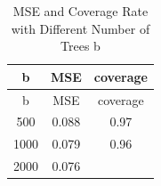 \documentclass[]{article}
\begin{document}
\begin{longtable}[]{@{}ccc@{}}
\caption{MSE and Coverage Rate with Different Number of Trees
b}\tabularnewline
\toprule
\begin{minipage}[b]{0.09\columnwidth}\centering\strut
b\strut
\end{minipage} & \begin{minipage}[b]{0.10\columnwidth}\centering\strut
MSE\strut
\end{minipage} & \begin{minipage}[b]{0.13\columnwidth}\centering\strut
coverage\strut
\end{minipage}\tabularnewline
\midrule
\endfirsthead
\toprule
\begin{minipage}[b]{0.09\columnwidth}\centering\strut
b\strut
\end{minipage} & \begin{minipage}[b]{0.10\columnwidth}\centering\strut
MSE\strut
\end{minipage} & \begin{minipage}[b]{0.13\columnwidth}\centering\strut
coverage\strut
\end{minipage}\tabularnewline
\midrule
\endhead
\begin{minipage}[t]{0.09\columnwidth}\centering\strut
500\strut
\end{minipage} & \begin{minipage}[t]{0.10\columnwidth}\centering\strut
0.088\strut
\end{minipage} & \begin{minipage}[t]{0.13\columnwidth}\centering\strut
0.97\strut
\end{minipage}\tabularnewline
\begin{minipage}[t]{0.09\columnwidth}\centering\strut
1000\strut
\end{minipage} & \begin{minipage}[t]{0.10\columnwidth}\centering\strut
0.079\strut
\end{minipage} & \begin{minipage}[t]{0.13\columnwidth}\centering\strut
0.96\strut
\end{minipage}\tabularnewline
\begin{minipage}[t]{0.09\columnwidth}\centering\strut
2000\strut
\end{minipage} & \begin{minipage}[t]{0.10\columnwidth}\centering\strut
0.076\strut
\end{minipage} & \begin{minipage}[t]{0.13\columnwidth}\centering\strut

\end{minipage}
\end{longtable}
\end{document}
